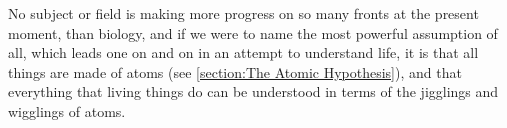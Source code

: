 No subject or field is making more progress on so many fronts at the present moment, than biology, and if we were to name the most powerful assumption of all, which leads one on and on in an attempt to understand life, it is that all things are made of atoms (see \ref{section:The Atomic Hypothesis}), and that everything that living things do can be understood in terms of the jigglings and wigglings of atoms.